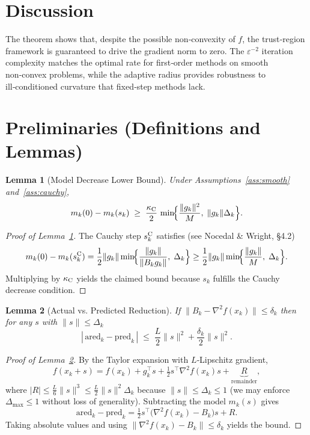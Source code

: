 \documentclass{article}
\newtheorem{lemma}{Lemma}
\begin{document}
\section*{Discussion}
The theorem shows that, despite the possible non‑convexity of $f$, the trust‑region framework is guaranteed to drive the gradient norm to zero.  The $\varepsilon^{-2}$ iteration complexity matches the optimal rate for first‑order methods on smooth non‑convex problems, while the adaptive radius provides robustness to ill‑conditioned curvature that fixed‑step methods lack.

\section*{Preliminaries (Definitions and Lemmas)}
\begin{lemma}[Model Decrease Lower Bound]\label{lem:model}
Under Assumptions~\ref{ass:smooth} and~\ref{ass:cauchy},
\[
m_{k}(0)-m_{k}(s_{k})\;\ge\;
\frac{\kappa_{\rm C}}{2}\,\min\!\Bigl\{\frac{\|g_{k}\|^{2}}{M},\;\|g_{k}\|\Delta_{k}\Bigr\}.
\]
\end{lemma}
\begin{proof}[Proof of Lemma~\ref{lem:model}]
The Cauchy step $s_{k}^{\rm C}$ satisfies (see Nocedal \& Wright, \S4.2)
\[
m_{k}(0)-m_{k}(s_{k}^{\rm C})=
\frac{1}{2}\|g_{k}\|\min\!\Bigl\{\frac{\|g_{k}\|}{\|B_{k}g_{k}\|},\;\Delta_{k}\Bigr\}
\ge
\frac{1}{2}\|g_{k}\|\min\!\Bigl\{\frac{\|g_{k}\|}{M},\;\Delta_{k}\Bigr\}.
\]
Multiplying by $\kappa_{\rm C}$ yields the claimed bound because $s_{k}$ fulfills the Cauchy decrease condition. \hfill\qedsymbol
\end{proof}

\begin{lemma}[Actual vs. Predicted Reduction]\label{lem:ratio}
If $\|B_{k}-\nabla^{2}f(x_{k})\|\le\delta_{k}$ then for any $s$ with $\|s\|\le\Delta_{k}$
\[
|\,\text{ared}_{k}-\text{pred}_{k}\,|
\;\le\;
\frac{L}{2}\|s\|^{2}+\frac{\delta_{k}}{2}\|s\|^{2}.
\]
\end{lemma}
\begin{proof}[Proof of Lemma~\ref{lem:ratio}]
By the Taylor expansion with $L$‑Lipschitz gradient,
\[
f(x_{k}+s)=f(x_{k})+g_{k}^{\top}s+\tfrac12 s^{\top}\nabla^{2}f(x_{k})s
+\underbrace{R}_{\text{remainder}},
\]
where $|R|\le \frac{L}{6}\|s\|^{3}\le\frac{L}{2}\|s\|^{2}\Delta_{k}$ because $\|s\|\le\Delta_{k}\le1$ (we may enforce $\Delta_{\max}\le 1$ without loss of generality).  
Subtracting the model $m_{k}(s)$ gives
\[
\text{ared}_{k}-\text{pred}_{k}
= \tfrac12 s^{\top}\bigl(\nabla^{2}f(x_{k})-B_{k}\bigr)s+R.
\]
Taking absolute values and using $\|\nabla^{2}f(x_{k})-B_{k}\|\le\delta_{k}$ yields the bound. \hfill\qedsymbol
\end{proof}
\end{document}
